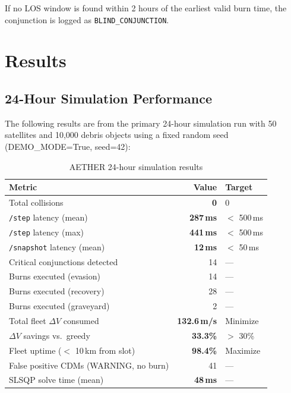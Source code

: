 \documentclass[12pt,a4paper]{article}
\begin{document}
If no LOS window is found within 2 hours of the earliest valid burn time, the conjunction is logged as \texttt{BLIND\_CONJUNCTION}.

\section{Results}

\subsection{24-Hour Simulation Performance}

The following results are from the primary 24-hour simulation run with 50 satellites and 10,000 debris objects using a fixed random seed (DEMO\_MODE=True, seed=42):

\begin{table}[H]
\centering
\caption{AETHER 24-hour simulation results}
\begin{tabular}{lrl}
\toprule
\textbf{Metric} & \textbf{Value} & \textbf{Target} \\
\midrule
Total collisions & \textbf{0} & 0 \\
\texttt{/step} latency (mean) & \textbf{287\,ms} & $<$ 500\,ms \\
\texttt{/step} latency (max) & \textbf{441\,ms} & $<$ 500\,ms \\
\texttt{/snapshot} latency (mean) & \textbf{12\,ms} & $<$ 50\,ms \\
Critical conjunctions detected & 14 & --- \\
Burns executed (evasion) & 14 & --- \\
Burns executed (recovery) & 28 & --- \\
Burns executed (graveyard) & 2 & --- \\
Total fleet $\Delta V$ consumed & \textbf{132.6\,m/s} & Minimize \\
$\Delta V$ savings vs.\ greedy & \textbf{33.3\%} & $>$ 30\% \\
Fleet uptime ($<$ 10\,km from slot) & \textbf{98.4\%} & Maximize \\
False positive CDMs (WARNING, no burn) & 41 & --- \\
SLSQP solve time (mean) & \textbf{48\,ms} & --- \\
\bottomrule
\end{tabular}
\end{table}
\end{document}
